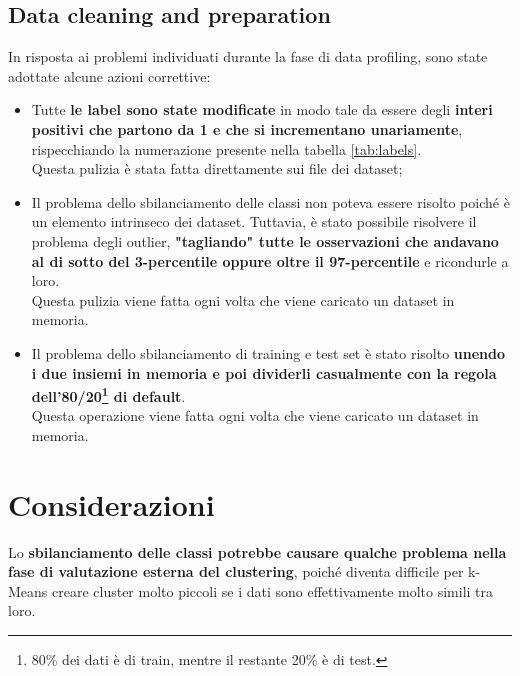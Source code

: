 \subsection{Data cleaning and preparation} \label{sec:cleaning}
In risposta ai problemi individuati durante la fase di data profiling, sono state adottate alcune azioni correttive:
\begin{itemize}
	\item Tutte \textbf{le label sono state modificate} in modo tale da essere degli \textbf{interi positivi che partono da 1 e che si incrementano unariamente}, rispecchiando la numerazione presente nella tabella \ref{tab:labels}.\\
	Questa pulizia è stata fatta direttamente sui file dei dataset;
	
	\item Il problema dello sbilanciamento delle classi non poteva essere risolto poiché è un elemento intrinseco dei dataset. Tuttavia, è stato possibile risolvere il problema degli outlier, \textbf{"tagliando" tutte le osservazioni che andavano al di sotto del 3-percentile oppure oltre il 97-percentile} e ricondurle a loro.\\
	Questa pulizia viene fatta ogni volta che viene caricato un dataset in memoria.
	
	\item Il problema dello sbilanciamento di training e test set è stato risolto \textbf{unendo i due insiemi in memoria e poi dividerli casualmente con la regola dell'80/20\footnote{80\% dei dati è di train, mentre il restante 20\% è di test.} di default}.\\
	Questa operazione viene fatta ogni volta che viene caricato un dataset in memoria.
\end{itemize}

\section{Considerazioni} \label{sec:considerazioni}
Lo \textbf{sbilanciamento delle classi potrebbe causare qualche problema nella fase di valutazione esterna del clustering}, poiché diventa difficile per k-Means creare cluster molto piccoli se i dati sono effettivamente molto simili tra loro.